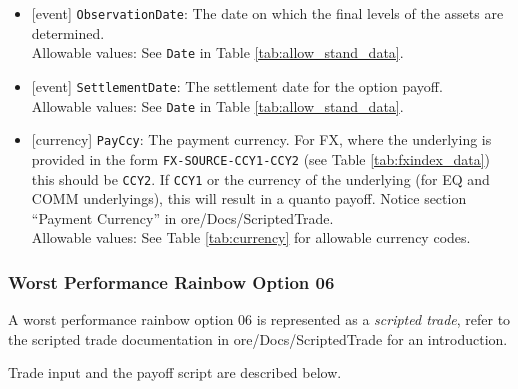 \begin{itemize}
  \item{}[event] \lstinline!ObservationDate!: The date on which the final levels of the assets are determined. \\
  Allowable values: See \lstinline!Date! in Table \ref{tab:allow_stand_data}.
  \item{}[event] \lstinline!SettlementDate!: The settlement date for the option payoff. \\
  Allowable values: See \lstinline!Date! in Table \ref{tab:allow_stand_data}.
  \item{}[currency] \lstinline!PayCcy!: The payment currency. For FX, where the underlying is provided
      in the form \lstinline!FX-SOURCE-CCY1-CCY2! (see Table \ref{tab:fxindex_data}) this should
      be \lstinline!CCY2!. If \lstinline!CCY1! or the currency of the underlying (for EQ and
      COMM underlyings), this will result in a quanto payoff. Notice section ``Payment Currency'' in ore/Docs/ScriptedTrade. \\
        Allowable values: See Table \ref{tab:currency} for allowable currency codes.
\end{itemize}

\subsubsection*{Worst Performance Rainbow Option 06}

A worst performance rainbow option 06 is represented as a {\em scripted trade},
refer to the scripted trade documentation in ore/Docs/ScriptedTrade
for an introduction.

Trade input and the payoff script are described below.

